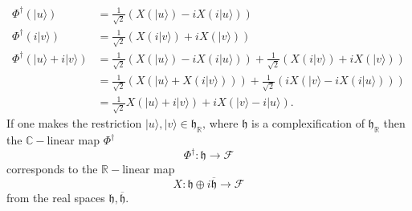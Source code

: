 \documentclass[aps, preprint]{revtex4}
\begin{document}
\begin{align}\Phi ^{ \dag } \left (\vert u \rangle \right ) &  =\frac{1}{\sqrt{2}} \left (X \left (\vert u \rangle \right ) -i X \left (i\vert u \rangle \right )\right ) \\
\Phi ^{ \dag } \left (i\vert v \rangle \right ) &  =\frac{1}{\sqrt{2}} \left (X \left (i\vert v \rangle \right ) +i X \left (\vert v \rangle \right )\right ) \\
\Phi ^{ \dag } \left (\vert u \rangle  +i\vert v \rangle \right ) &  =\frac{1}{\sqrt{2}} \left (X \left (\vert u \rangle \right ) -i X \left (i\vert u \rangle \right )\right ) +\frac{1}{\sqrt{2}} \left (X \left (i\vert v \rangle \right ) +i X \left (\vert v \rangle \right )\right ) \\
 &  =\frac{1}{\sqrt{2}} \left (X \left (\vert u \rangle  +X \left (i\vert v \rangle \right )\right )\right ) +\frac{1}{\sqrt{2}} \left (i X \left (\vert v \rangle  -i X \left (i\vert u \rangle \right )\right )\right ) \\
 &  =\frac{1}{\sqrt{2}} X \left (\vert u \rangle  +i\vert v \rangle \right ) +i X \left (\vert v \rangle  -i\vert u \rangle \right )\text{.}\end{align}If one makes the restriction $\vert u \rangle  ,\vert v \rangle  \in \mathfrak{h}_{\mathbb{R}}\text{,}$ where $\mathfrak{h}$ is a complexification of $\mathfrak{h}_{\mathbb{R}}$ then the $\mathbb{C} -$linear map $\Phi ^{ \dag }$
\begin{equation}\Phi ^{ \dag } :\mathfrak{h} \rightarrow \mathcal{F}
\end{equation}corresponds to the $\mathbb{R} -$linear map
\begin{equation}X :\mathfrak{h} \oplus i \overline{\mathfrak{h}} \rightarrow \mathcal{F}
\end{equation}from the real spaces $\mathfrak{h} ,\overline{\mathfrak{h}}\text{.}$ 
\end{document}
